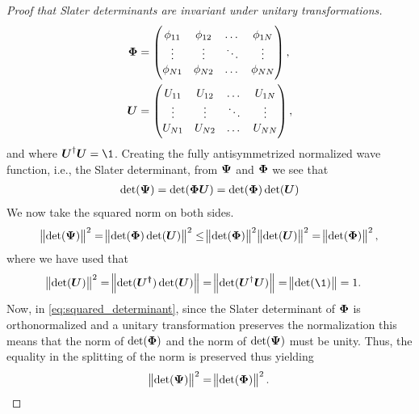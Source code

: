 \begin{proof}[Proof that Slater determinants are invariant under unitary
                transformations]
\begin{align}
                    \boldsymbol{\Phi}
                    &= \begin{pmatrix}
                        \phi_{11} & \phi_{12} & \dots & \phi_{1N} \\
                        \vdots & \vdots & \ddots & \vdots \\
                        \phi_{N1} & \phi_{N2} & \dots & \phi_{NN}
                    \end{pmatrix}, \\
                    \boldsymbol{U}
                    &= \begin{pmatrix}
                        U_{11} & U_{12} & \dots & U_{1N} \\
                        \vdots & \vdots & \ddots & \vdots \\
                        U_{N1} & U_{N2} & \dots & U_{NN}
                    \end{pmatrix},
                \end{align}
                and where $\vfg{U}^{\dagger}\vfg{U} = \1$.
                Creating the fully antisymmetrized normalized wave function, i.e.,
                the Slater determinant, from $\boldsymbol{\Psi}$ and $\boldsymbol{\Phi}$ we see
                that
                \begin{gather}
                    \det(\boldsymbol{\Psi}) = \det(\boldsymbol{\Phi}\boldsymbol{U})
                    = \det(\boldsymbol{\Phi})\det(\boldsymbol{U})
                \end{gather}
                We now take the squared norm on both sides.
                \begin{align}
                    \norm{\det(\boldsymbol{\Psi})}^2
                    = \norm{\det(\boldsymbol{\Phi})\det(\boldsymbol{U})}^2
                    \leq
                    \norm{\det(\boldsymbol{\Phi})}^2\norm{\det(\boldsymbol{U})}^2
                    = \norm{\det(\boldsymbol{\Phi})}^2,
                    \label{eq:squared_determinant}
                \end{align}
                where we have used that
                \begin{align}
                    \norm{\det(\vfg{U})}^2
                    &= \norm{\det(\vfg{U^{\dagger}})\det(\vfg{U})}
                    = \norm{\det(\vfg{U}^{\dagger}\vfg{U})}
                    = \norm{\det(\1)} = 1.
                \end{align}
                Now, in \autoref{eq:squared_determinant}, since the Slater
                determinant of $\boldsymbol{\Phi}$ is orthonormalized and a unitary
                transformation preserves the normalization this means that the norm
                of $\det(\boldsymbol{\Phi})$ and the norm of $\det(\boldsymbol{\Psi})$ must be
                unity.  Thus, the equality in the splitting of the norm is preserved
                thus yielding
                \begin{gather}
                    \norm{\det(\boldsymbol{\Psi})}^2 = \norm{\det(\boldsymbol{\Phi})}^2.
                \end{gather}
            \end{proof}
